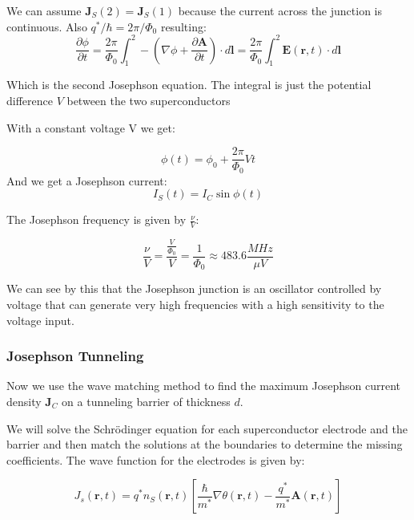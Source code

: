 \documentclass[12pt]{article}
\numberwithin{equation}{subsection}
\newcommand\page[1]{
{
}
}
\begin{document}
We can assume $\mathbf J_S(2)= \mathbf J_S(1)$ because the current across the junction is continuous. Also $q^*/\hbar = 2\pi/\Phi_0$ resulting:
\begin{equation}
    \frac{\partial \phi}{\partial t} = \frac{2\pi}{\Phi_0} \int_1^2 -\left (\nabla \phi+ \frac{\partial\mathbf A}{\partial t} \right) \cdot d \mathbf l=  \frac{2\pi}{\Phi_0} \int_1^2 \mathbf E (\mathbf r, t) \cdot d \mathbf l
\label{eq:phase-efield}
\end{equation}
\page{37}
Which is the second Josephson equation. The integral is just the potential difference $V$ between the two superconductors 

With a constant voltage V we get:

\begin{equation}
    \phi(t) = \phi_0 +\frac{2\pi}{\Phi_0}V t
    \label{eq:cst-voltage}
\end{equation}
And we get a Josephson current:
\begin{equation}
    I_S(t) = I_C\sin\phi(t)
    \label{eq:josephson-current}
\end{equation}

The Josephson frequency is given by $\frac{\nu}{V}$:

\begin{equation}
    \frac{\nu}{V} = \frac{\frac{V}{\Phi_0}}{V}= \frac{1}{\Phi_0} \approx 483.6\frac{MHz}{\mu V}
\end{equation}

We can see by this that the Josephson junction is an oscillator controlled by voltage that can generate very high frequencies with a high sensitivity to the voltage input.

\subsubsection{Josephson Tunneling}
Now we use the wave matching method to find the maximum Josephson current density $\mathbf J_C$ on a tunneling barrier of thickness $d$.
\page{38}
We will solve the Schrödinger equation for each superconductor electrode and the barrier and then match the solutions at the boundaries to determine the missing coefficients.
The wave function for the electrodes is given by:

\begin{equation}
    J_s(\mathbf r, t) = q^*n_S(\mathbf r, t) \left [ \frac{\hbar}{m^*}\nabla\theta(\mathbf r, t) - \frac{q^*}{m^*}\mathbf A (\mathbf r, t)  \right] 
\end{equation}
\end{document}
